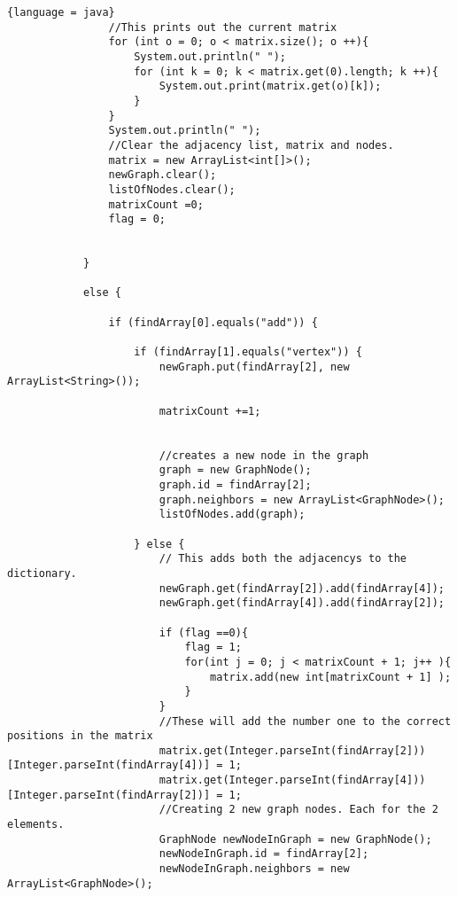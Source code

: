 \documentclass{article}
\begin{document}
\begin{lstlisting}{language = java}
                //This prints out the current matrix
                for (int o = 0; o < matrix.size(); o ++){
                    System.out.println(" ");
                    for (int k = 0; k < matrix.get(0).length; k ++){
                        System.out.print(matrix.get(o)[k]);
                    }
                }
                System.out.println(" ");
                //Clear the adjacency list, matrix and nodes.
                matrix = new ArrayList<int[]>();
                newGraph.clear();
                listOfNodes.clear();
                matrixCount =0;
                flag = 0;

                
            }

            else {

                if (findArray[0].equals("add")) {

                    if (findArray[1].equals("vertex")) {
                        newGraph.put(findArray[2], new ArrayList<String>());

                        matrixCount +=1;
                        

                        //creates a new node in the graph
                        graph = new GraphNode();
                        graph.id = findArray[2];
                        graph.neighbors = new ArrayList<GraphNode>();
                        listOfNodes.add(graph);
                        
                    } else {
                        // This adds both the adjacencys to the dictionary.
                        newGraph.get(findArray[2]).add(findArray[4]);
                        newGraph.get(findArray[4]).add(findArray[2]);
                        
                        if (flag ==0){
                            flag = 1;
                            for(int j = 0; j < matrixCount + 1; j++ ){
                                matrix.add(new int[matrixCount + 1] );
                            }
                        }
                        //These will add the number one to the correct positions in the matrix
                        matrix.get(Integer.parseInt(findArray[2]))[Integer.parseInt(findArray[4])] = 1;
                        matrix.get(Integer.parseInt(findArray[4]))[Integer.parseInt(findArray[2])] = 1;
                        //Creating 2 new graph nodes. Each for the 2 elements.
                        GraphNode newNodeInGraph = new GraphNode();
                        newNodeInGraph.id = findArray[2];
                        newNodeInGraph.neighbors = new ArrayList<GraphNode>();


\end{lstlisting}
\end{document}

